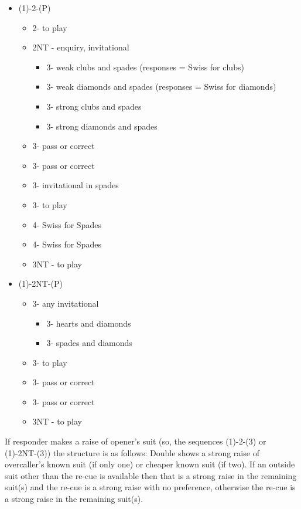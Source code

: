 \documentclass[a4paper,14pt]{extarticle}
\begin{document}
\begin{itemize}
\item (1\hearts)-2\hearts-(P)
	\begin{itemize}
	\item 2\spades - to play
	\item 2NT - enquiry, invitational
		\begin{itemize}
		\item 3\clubs - weak clubs and spades (responses = Swiss for clubs)
		\item 3\diamonds - weak diamonds and spades (responses = Swiss for diamonds)
		\item 3\hearts - strong clubs and spades
		\item 3\spades - strong diamonds and spades
		\end{itemize}
	\item 3\clubs - pass or correct
	\item 3\diamonds - pass or correct
	\item 3\hearts - invitational in spades
	\item 3\spades - to play
	\item 4\clubs - Swiss for Spades
	\item 4\diamonds - Swiss for Spades
	\item 3NT - to play
	\end{itemize}
\item (1\clubs)-2NT-(P)
	\begin{itemize}
	\item 3\clubs - any invitational
		\begin{itemize}
		\item 3\hearts - hearts and diamonds
		\item 3\spades - spades and diamonds
		\end{itemize}
	\item 3\diamonds - to play
	\item 3\hearts - pass or correct
	\item 3\spades - pass or correct
	\item 3NT - to play
	\end{itemize}
\end{itemize}

If responder makes a raise of opener's suit (so, the sequences (1\clubs)-2\clubs-(3\clubs)
or (1\hearts)-2NT-(3\clubs)) the structure is as follows: Double shows a strong raise of
overcaller's known suit (if only one) or cheaper known suit (if two). If an outside suit other than the re-cue
is available then that is a strong raise in the remaining suit(s) and the re-cue is a strong raise with no 
preference, otherwise the re-cue is a strong raise in the remaining suit(s).
\end{document}
